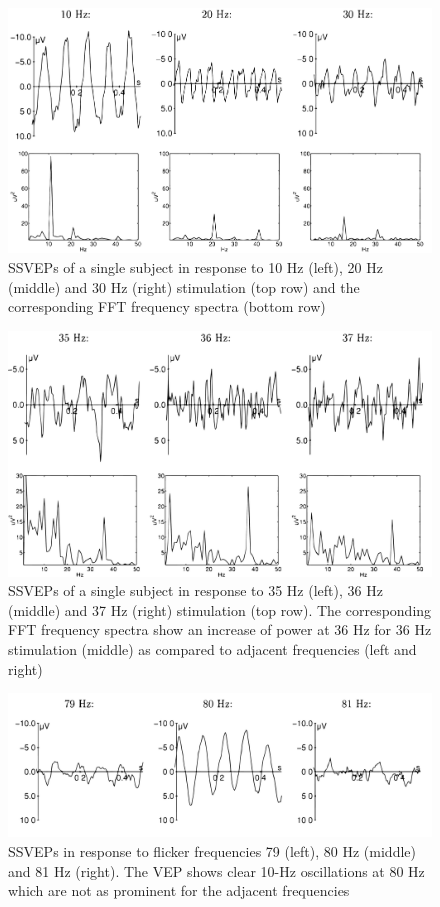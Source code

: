 \begin{figure}[ht]
	\centering
  	\includegraphics[scale = 0.21]{chapter2/26.pdf}
  	\caption{SSVEPs of a single subject in response to 10 Hz (left), 20 Hz (middle) and 30 Hz (right) stimulation (top row) and the corresponding FFT frequency spectra (bottom row)}
\end{figure}

\begin{figure}[ht]
	\centering
  	\includegraphics[scale = 0.2]{chapter2/27.pdf}
  	\caption{SSVEPs of a single subject in response to 35 Hz (left), 36 Hz (middle) and 37 Hz (right) stimulation (top row). The corresponding FFT frequency spectra show an increase of power at 36 Hz for 36 Hz stimulation (middle) as compared to adjacent frequencies (left and right)}
\end{figure}

\begin{figure}[ht]
	\centering
  	\includegraphics[scale = 0.18]{chapter2/28.pdf}
  	\caption{ SSVEPs in response to flicker frequencies 79 (left), 80 Hz (middle) and 81 Hz (right). The VEP shows clear 10-Hz oscillations at 80 Hz which are not as prominent for the adjacent frequencies}
\end{figure}

